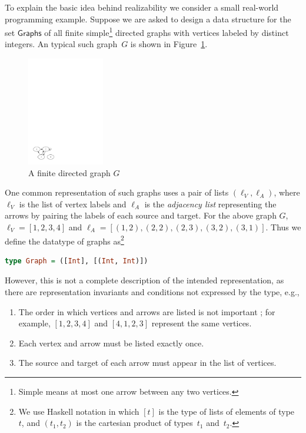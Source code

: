 To explain the basic idea behind realizability we consider a small
real-world programming example. Suppose we are asked to design a data
structure for the set $\mathsf{Graphs}$ of all finite
simple\footnote{Simple means at most one arrow between any two
  vertices.} directed graphs with vertices labeled by distinct
integers. An typical such graph~$G$ is shown in
Figure~\ref{fig:digraph}.
%
\begin{figure}[htp]
  \centering
  \includegraphics[width=0.3\textwidth]{digraph}
  \caption{A finite directed graph $G$}
  \label{fig:digraph}
\end{figure}
%
One common representation of such graphs uses a pair of lists
$(\ell_V, \ell_A)$, where $\ell_V$ is the list of vertex labels and
$\ell_A$ is the \emph{adjacency list} representing the arrows by
pairing the labels of each source and target. For the above graph $G$,
$\ell_V = [1, 2, 3, 4]$ and $\ell_A = [(1,2), (2,2), (2,3), (3,2),
(3,1)]$.
%
Thus we define the datatype of graphs as\footnote{We use Haskell
  notation in which $[t]$ is the type of lists of elements of
  type~$t$, and $(t_1, t_2)$ is the cartesian product of types~$t_1$
  and~$t_2$.}
%
\begin{lstlisting}[language=Haskell]
type Graph = ([Int], [(Int, Int)])
\end{lstlisting}
%
However, this is not a complete description of the intended
representation, as there are representation invariants and conditions
not expressed by the type, e.g.,
%
\begin{enumerate}
\item The order in which vertices and arrows are listed is not
  important%
; for example, $[1,2,3,4]$ and $[4,1,2,3]$ represent the same vertices.
\item Each vertex and arrow must be listed exactly once.
\item The source and target of each arrow must appear in the list of vertices.
\end{enumerate}
